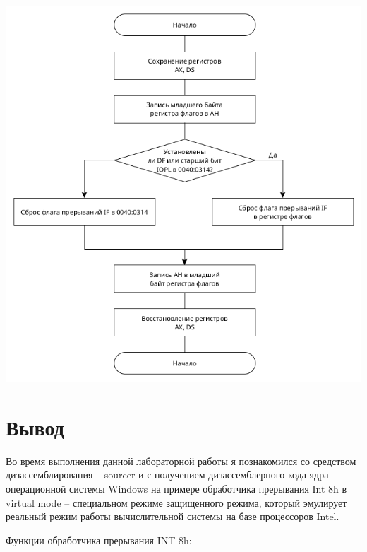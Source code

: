 \documentclass[14pt, a4paper]{article}
\begin{document}
	\begin{minipage}{0.9\linewidth}
		\includegraphics[width=\linewidth]{diagram2}
	\end{minipage}
	
	\pagebreak
	
	\section{Вывод}
	
	Во время выполнения данной лабораторной работы я познакомился со средством дизассемблирования – sourcer и с получением дизассемблерного кода ядра операционной системы Windows на примере обработчика прерывания Int 8h в virtual mode – специальном режиме защищенного режима, который эмулирует реальный режим работы вычислительной системы на базе процессоров Intel.
	
	Функции обработчика прерывания INT 8h:
	
\end{document}
